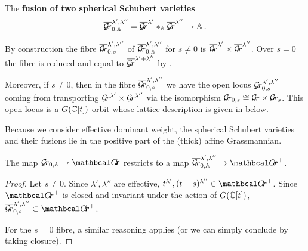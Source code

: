 \documentclass[draft]{article}
\begin{document}
\begin{definition} 
    The \textbf{fusion of two spherical Schubert varieties} 
    $$ 
    \overline{\mathcal{G}\!r}^{\lambda', \lambda''}_{0, \mathbb A} = \overline{\mathcal{G}\!r}^{\lambda'} \ast_\mathbb A \overline{\mathcal{G}\!r}^{\lambda''} \rightarrow \mathbb A \,.
    $$
\end{definition}
By construction the fibre $ \overline{\mathcal{G}\!r}_{0,s}^{\lambda', \lambda''} $ of $\overline{\mathcal{G}\!r}^{\lambda', \lambda''}_{0, \mathbb A}$ for $ s \ne 0 $ is $ \overline{\mathcal{G}\!r}^{\lambda'} \times \overline{\mathcal{G}\!r}^{\lambda''}$.  
Over $s=0$ the fibre is reduced and equal to $ \overline{\mathcal{G}\!r}^{\lambda' + \lambda''}$ by 
\cite[Proposition 3.1.14]{zhu2016introduction}. 

Moreover, if $s\ne0$, then in the fibre $\overline{\mathcal{G}\!r}_{0,s}^{\lambda', \lambda''}$ we have the open locus $ \mathcal{G}\!r_{0,s}^{\lambda', \lambda''}$ coming from transporting $ \mathcal{G}\!r^{\lambda'} \times \mathcal{G}\!r^{\lambda''} $ via the isomorphism $ \mathcal{G}\!r_{0,s} \cong \mathcal{G}\!r \times \mathcal{G}\!r_s $.  This open locus is a $ G(\mathbb C[t])$-orbit
whose lattice description is given in  below.

Because we consider effective dominant weight, the spherical Schubert varieties and their fusions lie in the positive part of the (thick) affine Grassmannian.

\begin{lemma}
    The map $ \Gr_{0, \AA} \rightarrow \Grth$ restricts to a map $ \overline{\Gr}^{\lambda', \lambda''}_{0, \AA} \rightarrow \Grth^+$.
\end{lemma}
\begin{proof}
    Let $ s \ne 0 $. Since $ \lambda', \lambda'' $ are effective, $ t^{\lambda'}, (t-s)^{\lambda''} \in \Grth^+ $.  Since $\Grth^+$ is closed and invariant under the action of $ G(\mathbb C[t])$,  $ \overline{\Gr}_{0,s}^{\lambda', \lambda''} \subset \Grth^+$.
    
    For the $ s = 0$ fibre, a similar reasoning applies (or we can simply conclude by taking closure).
\end{proof}
\end{document}
